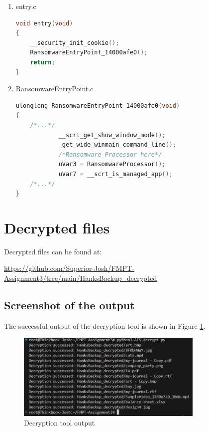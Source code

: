 \documentclass[11pt]{article}
\begin{document}
\begin{enumerate}
    \item entry.c \begin{lstlisting}[language=C++, caption=entry.c]
void entry(void)
{
    __security_init_cookie();
    RansomwareEntryPoint_14000afe0();
    return;
}
\end{lstlisting}

    \item RansomwareEntryPoint.c \begin{lstlisting}[language=C++, caption=RansomwareEntryPoint\_14000afe0.c]
ulonglong RansomwareEntryPoint_14000afe0(void)
{
    /*...*/
            __scrt_get_show_window_mode();
            _get_wide_winmain_command_line();
            /*Ransomware Processor here*/
            uVar3 = RansomwareProcessor();
            uVar7 = __scrt_is_managed_app();
    /*...*/
}
\end{lstlisting}

\end{enumerate}

\newpage
\section{Decrypted files}
Decrypted files can be found at:

\url{https://github.com/Superior-Josh/FMPT-Assignment3/tree/main/HanksBackup_decrypted}

\subsection{Screenshot of the output}
The successful output of the decryption tool is shown in Figure \ref{fig:output}.
\begin{figure}[htbp]
    \centering
    \includegraphics[width=0.8\textwidth]{img/output.png}
    \caption{Decryption tool output}
    \label{fig:output}
\end{figure}
\end{document}
